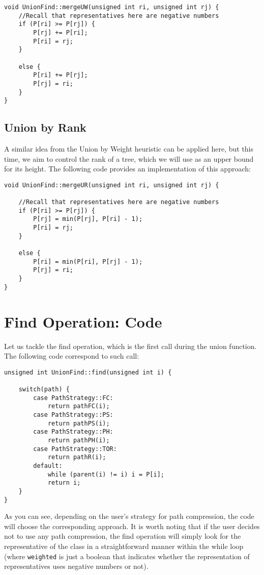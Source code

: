 \begin{verbatim}
void UnionFind::mergeUW(unsigned int ri, unsigned int rj) {
    //Recall that representatives here are negative numbers
    if (P[ri] >= P[rj]) {
        P[rj] += P[ri];
        P[ri] = rj;
    }

    else {
        P[ri] += P[rj];
        P[rj] = ri;
    }
}
\end{verbatim}

\subsection{Union by Rank}
A similar idea from the Union by Weight heuristic can be applied here, but this time, we aim to control the rank of a tree, which we will use as an upper bound for its height. The following code provides an implementation of this approach:

\begin{verbatim}
void UnionFind::mergeUR(unsigned int ri, unsigned int rj) {

    //Recall that representatives here are negative numbers
    if (P[ri] >= P[rj]) {
        P[rj] = min(P[rj], P[ri] - 1);
        P[ri] = rj;
    }

    else {
        P[ri] = min(P[ri], P[rj] - 1);
        P[rj] = ri;
    }
}
\end{verbatim}

\section{Find Operation: Code}\label{ap:Path}
Let us tackle the find operation, which is the first call during the union function. The following code correspond to such call: 

\begin{verbatim}
unsigned int UnionFind::find(unsigned int i) {

    switch(path) {
        case PathStrategy::FC:
            return pathFC(i);
        case PathStrategy::PS:
            return pathPS(i);
        case PathStrategy::PH:
            return pathPH(i);
        case PathStrategy::TOR:
            return pathR(i);
        default:
            while (parent(i) != i) i = P[i];
            return i;
    }
}

\end{verbatim}

As you can see, depending on the user's strategy for path compression, the code will choose the corresponding approach. It is worth noting that if the user decides not to use any path compression, the find operation will simply look for the representative of the class in a straightforward manner within the while loop (where \texttt{weighted} is just a boolean that indicates whether the representation of representatives uses negative numbers or not).


